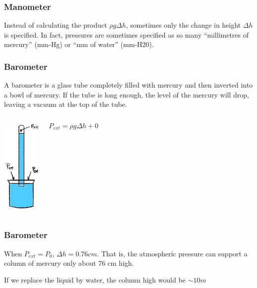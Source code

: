 \documentclass[]{beamer}
\begin{document}

\begin{frame}
\frametitle{Manometer}




Instead of calculating the product $\rho g \Delta h$, sometimes only the change in height $\Delta h$ is specified. In fact, pressures are sometimes specified as so many “millimetres
of mercury” (mm-Hg) or “mm of water” (mm-H20).


  \end{frame}

\begin{frame}
\frametitle{Barometer}

A barometer is a glass tube completely filled with mercury and then inverted into a bowl of mercury. If the tube is long enough, the level of the mercury will drop, leaving a
vacuum at the top of the tube.

   \begin{columns}[c]
   \column{2in}  %
    \begin{center}
  \includegraphics[height=1.8in]{images2/Barometer.jpg}
\end{center}

   \column{2in}
\begin{equation*}
P_{ext}=\rho g \Delta h +0
\end{equation*}
   \end{columns}




  \end{frame}



\begin{frame}
\frametitle{Barometer}


When $P_{ext}=P_0$, $\Delta h=0.76 cm$. That is, the atmospheric pressure can support a column of mercury only about 76 cm high.

\vspace{3mm}

If we replace the liquid by water, the column high would be $\sim 10 m$

  \end{frame}
\end{document}

